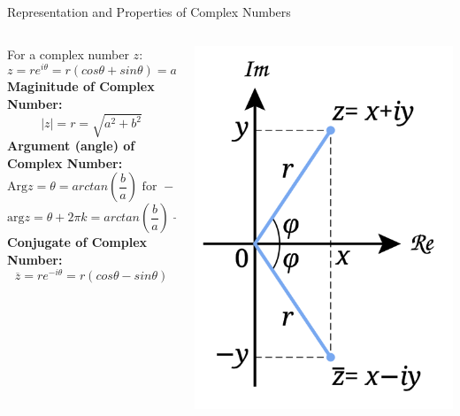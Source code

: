 \documentclass{beamer}
\begin{document}
\begin{frame}[t]{Representation and Properties of Complex Numbers}
    \begin{columns}
        \hspace{0.5em}
		\begin{column}{.7\textwidth}
            For a complex number $z$:
            \[z = r e^{i \theta} = r(cos\theta + sin \theta) = a + b i\]
            \textbf{Maginitude of Complex Number:}
            \[|z| = r = \sqrt{a^2 + b^2}\]
            \textbf{Argument (angle) of Complex Number:}
            \[\text{Arg} z = \theta = arctan(\frac{b}{a}) \text{ for } -\pi \leq \theta < \pi\]
            \[\text{arg} z = \theta + 2 \pi k  = arctan(\frac{b}{a}) + 2 \pi k \text{ for k } \in \mathbb{Z}\]
            \textbf{Conjugate of Complex Number:}
            \[ \overline{z} = r e ^{-i \theta} = r(cos \theta - sin\theta)\]
		\end{column}
        \hspace{0em}
		\begin{column}{.3\textwidth}
            \begin{center}
                \includegraphics[width=1.0\textwidth]{./img/complex_conjugate.png}
            \end{center}
		\end{column}
        \hspace{2em}
	\end{columns}
\end{frame}
\end{document}
